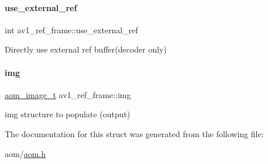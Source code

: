 \paragraph{\texorpdfstring{use\+\_\+external\+\_\+ref}{use\_external\_ref}}
{\footnotesize\ttfamily int av1\+\_\+ref\+\_\+frame\+::use\+\_\+external\+\_\+ref}

Directly use external ref buffer(decoder only) \mbox{\label{structav1__ref__frame_a55a09db9e1acdd73e656b01fa01283b3}} 
\paragraph{\texorpdfstring{img}{img}}
{\footnotesize\ttfamily \hyperlink{aom__image_8h_a5409ae8fdb326fe1cc32622ef4e23748}{aom\+\_\+image\+\_\+t} av1\+\_\+ref\+\_\+frame\+::img}

img structure to populate (output) 

The documentation for this struct was generated from the following file\+:\begin{DoxyCompactItemize}
\item 
aom/\hyperlink{aom_8h}{aom.\+h}\end{DoxyCompactItemize}
